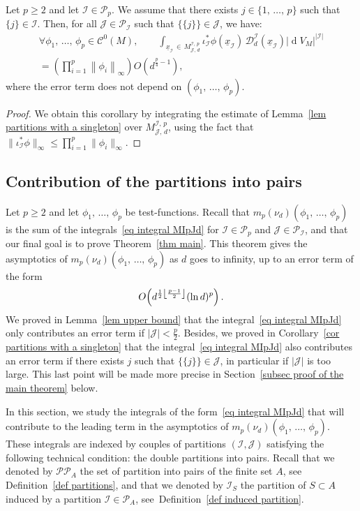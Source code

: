 \documentclass[AHL,Unicode,longabstracts,published]{cedram}
\DeclareMathOperator{\dmesure}{d}
\DeclarePairedDelimiter{\floor}{\lfloor}{\rfloor}
\newcommand{\D}{\mathcal{D}}
\newcommand{\I}{\mathcal{I}}
\newcommand{\J}{\mathcal{J}}
\newcommand{\clC}{\mathcal{C}}
\newcommand{\pa}{\mathcal{P}\!}
\newcommand{\pp}{\mathcal{P\!P}\!}
\newcommand{\norm}[1]{\left\lvert #1 \right\rvert}
\newcommand{\Norm}[1]{\left\lVert #1 \right\rVert}
\newcommand{\rmes}[1]{\norm{\dmesure\! V_{#1}}}
\renewcommand{\geq}{\geqslant}
\renewcommand{\leq}{\leqslant}
\let\oldforall\forall
\renewcommand*{\forall}{\mathrel{\oldforall}}
\begin{document}
\begin{coro}\label{cor partitions with a singleton}
Let $p \geq 2$ and let $\I \in \pa_p$. We assume that there exists $j \in \{1,\,\dots,\,p\}$ such that $\{j\} \in \I$. Then, for all $\J \in \pa_\I$ such that $\{\{j\}\} \in \J$, we have:
\begin{multline*}
\forall \phi_1,\,\dots,\,\phi_p \in \clC^0(M), \qquad \int_{\underline{x}_\I\,\in\,M^{\I,\,p}_{\J,\,d}} \iota_\I^*\phi(\underline{x}_\I)\, \D^\I_d(\underline{x}_\I) \rmes{M}^{\norm{\I}}\\
= \left(\prod_{i=1}^p \Norm{\phi_i}_\infty\right) O\left(d^{\frac{p}{4}-1}\right),
\end{multline*}
where the error term does not depend on $(\phi_1,\,\dots,\,\phi_p)$.
\end{coro}

\begin{proof}
We obtain this corollary by integrating the estimate of Lemma~\ref{lem partitions with a singleton} over $M^{\I,\,p}_{\J,\,d}$, using the fact that $\|\iota_\I^* \phi\|_\infty \leq \prod_{i=1}^p \|\phi_i\|_\infty$.
\end{proof}



\subsection{Contribution of the partitions into pairs}\label{subsec contribution of the partitions into pairs}

Let $p \geq 2$ and let $\phi_1,\,\dots,\,\phi_p$ be test-functions. Recall that $m_p(\nu_d)(\phi_1,\,\dots,\,\phi_p)$ is the sum of the integrals~\eqref{eq integral MIpJd} for $\I \in \pa_p$ and $\J \in \pa_\I$, and that our final goal is to prove Theorem~\ref{thm main}. This theorem gives the asymptotics of $m_p(\nu_d)(\phi_1,\,\dots,\,\phi_p)$ as $d$ goes to infinity, up to an error term of the form
\[
O\!\left(d^{\frac{1}{2}\floor*{\frac{p-1}{2}}}(\ln d)^p\right).
\]
We proved in Lemma~\ref{lem upper bound} that the integral~\eqref{eq integral MIpJd} only contributes an error term if $|\J| < \tfrac{p}{2}$. Besides, we proved in Corollary~\ref{cor partitions with a singleton} that the integral~\eqref{eq integral MIpJd} also contributes an error term if there exists $j$ such that $\{\{j\}\} \in \J$, in particular if $|\J|$ is too large. This last point will be made more precise in Section~\ref{subsec proof of the main theorem} below.

In this section, we study the integrals of the form~\eqref{eq integral MIpJd} that will contribute to the leading term in the asymptotics of $m_p(\nu_d)(\phi_1,\,\dots,\,\phi_p)$. These integrals are indexed by couples of partitions $(\I,\J)$ satisfying the following technical condition: the double partitions into pairs. Recall that we denoted by $\pp_A$ the set of partition into pairs of the finite set $A$, see Definition~\ref{def partitions}, and that we denoted by $\I_S$ the partition of $S \subset A$ induced by a partition $\I \in \pa_A$, see~Definition~\ref{def induced partition}.
\end{document}
